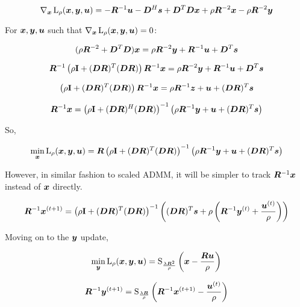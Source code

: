 \begin{equation}
\nabla_{\bm{x}}\operatorname{L}_{\rho}(\bm{x},\bm{y},\bm{u}) = -\bm{R}^{-1}\bm{u} - \bm{D}^H\bm{s} + \bm{D}^T\bm{D}\bm{x} + \rho\bm{R}^{-2}\bm{x} - \rho\bm{R}^{-2}\bm{y}
\end{equation}

For $\bm{x},\bm{y},\bm{u}$ such that $\nabla_{\bm{x}}\operatorname{L}_{\rho}(\bm{x},\bm{y},\bm{u}) = 0$:

\begin{equation}
(\rho\bm{R}^{-2} + \bm{D}^T\bm{D})\bm{x} = \rho\bm{R}^{-2}\bm{y} + \bm{R}^{-1} \bm{u} + \bm{D}^T\bm{s}
\end{equation}

\begin{equation}
\bm{R}^{-1}\left(\rho{\bf I} + (\bm{D}\bm{R})^T(\bm{D}\bm{R})\right)\bm{R}^{-1}\bm{x} = \rho\bm{R}^{-2}\bm{y} + \bm{R}^{-1}\bm{u} + \bm{D}^T\bm{s}
\end{equation}

\begin{equation}
\left(\rho{\bf I} + (\bm{D}\bm{R})^T(\bm{D}\bm{R})\right)\bm{R}^{-1}\bm{x} = \rho\bm{R}^{-1}\bm{z} + \bm{u} + (\bm{D}\bm{R})^T\bm{s}
\end{equation}

\begin{equation}
\bm{R}^{-1}\bm{x} = \left(\rho{\bf I} + (\bm{D}\bm{R})^H(\bm{D}\bm{R})\right)^{-1}\left(\rho\bm{R}^{-1}\bm{y} + \bm{u} + (\bm{D}\bm{R})^T\bm{s}\right)
\end{equation}

So,

\begin{equation}
\min_{\bm{x}} \operatorname{L}_{\rho}(\bm{x},\bm{y},\bm{u}) = \bm{R}\left(\rho{\bf I} + (\bm{D}\bm{R})^T(\bm{D}\bm{R})\right)^{-1}\left(\rho\bm{R}^{-1}\bm{y} + \bm{u} + (\bm{D}\bm{R})^T\bm{s}\right)
\end{equation}

However, in similar fashion to scaled ADMM, it will be simpler to track $\bm{R}^{-1}\bm{x}$ instead of $\bm{x}$ directly.

\begin{equation}
\bm{R}^{-1}\bm{x}^{(t + 1)} = \left(\rho{\bf I} + (\bm{D}\bm{R})^T(\bm{D}\bm{R})\right)^{-1}\left((\bm{D}\bm{R})^T\bm{s} + \rho\left(\bm{R}^{-1}\bm{y}^{(t)} + \frac{\bm{u}^{(t)}}{\rho}\right)\right)
\end{equation}

Moving on to the $\bm{y}$ update,

\begin{equation}
\min_{\bm{y}} \operatorname{L}_{\rho}(\bm{x},\bm{y},\bm{u}) = \operatorname{S}_{\frac{\lambda\bm{R}^2}{\rho}}\left(\bm{x} - \frac{\bm{R}\bm{u}}{\rho}\right)
\end{equation}

\begin{equation}
\bm{R}^{-1}\bm{y}^{(t + 1)}= \operatorname{S}_{\frac{\lambda\bm{R}}{\rho}}\left(\bm{R}^{-1}\bm{x}^{(t + 1)} - \frac{\bm{u}^{(t)}}{\rho}\right)
\end{equation}

